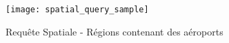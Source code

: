 \begin{figure}[ht]
   \centering
   \texttt{[image: spatial\_query\_sample]}
   \caption{Requête Spatiale - Régions contenant des aéroports \nixcaption}
   \label{fig:spatialquerysample}
\end{figure}

\FloatBarrier
